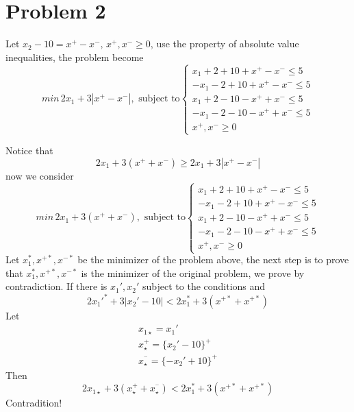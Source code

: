 \documentclass[a4paper]{article}
\begin{document}
\section{Problem 2}
Let $x_2-10=x^+-x^-,\, x^+,x^-\geq 0$, use the property of absolute value inequalities, the problem become
\begin{equation}  
min \, 2x_1+3|x^+-x^-|, \text{ subject to}
\left\{  
             \begin{array}{ll}
             x_1+2+10+x^+-x^-\leq 5\\
             -x_1-2+10+x^+-x^-\leq 5\\
             x_1+2-10-x^++x^-\leq 5\\
             -x_1-2-10-x^++x^-\leq 5\\
             x^+,x^-\geq 0
             \end{array}  
\right.  
\end{equation}  

Notice that 
\begin{equation}  
2x_1+3(x^++x^-) \geq 2x_1+3|x^+-x^-|
\end{equation}  
now we consider 
\begin{equation}  
min \,2x_1+3(x^++x^-) , \text{ subject to}
\left\{  
             \begin{array}{ll}
             x_1+2+10+x^+-x^-\leq 5\\
             -x_1-2+10+x^+-x^-\leq 5\\
             x_1+2-10-x^++x^-\leq 5\\
             -x_1-2-10-x^++x^-\leq 5\\
             x^+,x^-\geq 0
             \end{array}  
\right.  
\end{equation}  
Let $x_1^*,x^{+*},x^{-*}$ be the minimizer of the problem above, the next step is to prove that  $x_1^*,x^{+*},x^{-*}$ is the minimizer of the original problem, we prove by contradiction.
If there is $x_1',x_2'$ subject to the conditions and 
\begin{equation}  
2x_1'^*+3|x_2'-10| < 2x_1^*+3(x^{+*}+x^{+*})
\end{equation}  
Let 
\begin{eqnarray*}  
x_{1\star}=x_1'\\
x^{+}_\star=\{x_2'-10\}^+\\
x^{^-}_\star=\{-x_2'+10\}^+
\end{eqnarray*}  
Then 
\begin{equation}  
2x_{1\star}+3(x^{+}_\star+x^{^-}_\star) < 2x_1^*+3(x^{+*}+x^{+*})
\end{equation}  
Contradition!
\end{document}
